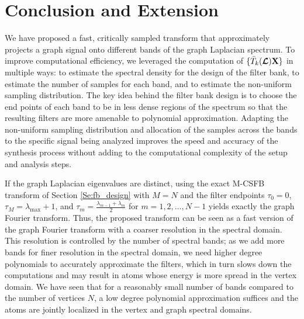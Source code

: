 \documentclass[journal, 10pt]{IEEEtran}
\begin{document}
\section{Conclusion and Extension}
\label{Sec:ongoing}
We have proposed a fast, critically sampled transform that approximately projects a graph signal onto different bands of the graph Laplacian spectrum. To improve computational efficiency, we leveraged the computation of $\{\bar{T}_k(\boldsymbol{\mathcal{L}}){\bf X}\}$ in multiple ways: to estimate the spectral density for the design of the filter bank, to estimate the number of samples for each band, and to estimate the non-uniform sampling distribution. The key idea behind the filter bank design is to choose the end points of each band to be in less dense regions of the spectrum so that the resulting filters are more amenable to polynomial approximation. Adapting the non-uniform sampling distribution and allocation of the samples across the bands to the specific signal being analyzed improves the speed and accuracy of the synthesis process without adding to the computational complexity of the setup and analysis steps. 

If the graph Laplacian eigenvalues are distinct, using the exact M-CSFB transform of Section \ref{Se:fb_design} with $M=N$ and the filter endpoints $\tau_0=0$, $\tau_M = \lambda_{\max}+1$, and $\tau_m=\frac{\lambda_{m-1}+\lambda_m}{2}$ for $m=1,2,\ldots,N-1$ yields exactly the graph Fourier transform. Thus, the proposed transform can be seen as a fast version of the graph Fourier transform with a coarser resolution in the spectral domain. This resolution is controlled by the number of spectral bands; as we add more bands for finer resolution in the spectral domain, we need higher degree polynomials to accurately approximate the filters, which in turn slows down the computations and may result in atoms whose energy is more spread in the vertex domain. We have seen that for a reasonably small number of bands compared to the number of vertices $N$, a low degree polynomial approximation suffices and the atoms are jointly localized in the vertex and graph spectral domains. 
\end{document}
